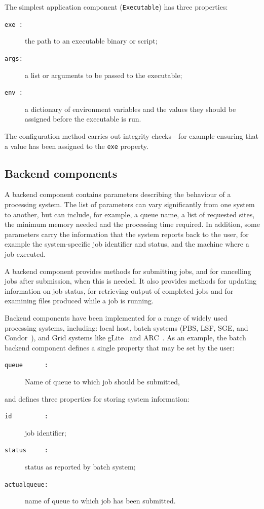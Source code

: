 \documentclass{elsart}
\def\grid {Grid\xspace}
\newcommand{\code}[1]{\texttt{#1}}
\begin{document}
The simplest application component (\texttt{Executable}) has three properties:
\begin{description}
\item[\code{exe :}] the path to an executable binary or script;
\item[\code{args:}] a list or arguments to be passed to the executable;
\item[\code{env :}] a dictionary of environment variables and the values they
  should be assigned before the executable is run.
\end{description}
The configuration method carries out integrity checks - for example
ensuring that a value has been assigned to the \code{exe} property.

\subsection{Backend components}
A backend component contains parameters describing the
behaviour of a processing system. The list of
parameters can vary significantly from one system to another, but can include,
for example, a queue name, a list of requested sites, the minimum memory
needed and the processing time required. In addition, some parameters carry the
information that the system reports back to the user, for example the 
system-specific job identifier and status, and the machine where a
job executed.

A backend component provides methods for submitting jobs, and for cancelling
jobs after submission, when this is needed.  It also provides methods for
updating information on job status, for retrieving output of completed jobs
and for examining files produced while a job is running.

Backend components have been implemented for a range of widely used processing
systems, including: local host, batch systems (PBS, LSF, SGE, and
Condor~\cite{Batch}), and \grid systems like gLite~\cite{LCG} and
ARC~\cite{NorduGrid}.  As an example, the batch backend component defines
a single property that may be set by the user:
\begin{description}
\item[\code{queue~~~~~~:}] Name of queue to which job should be submitted,
\end{description}
and defines three properties for storing system information:
\begin{description}
\item[\code{id~~~~~~~~~:}] job identifier;
\item[\code{status~~~~~:}] status as reported by batch system;
\item[\code{actualqueue:}] name of queue to which job has been submitted.
\end{description}
\end{document}
